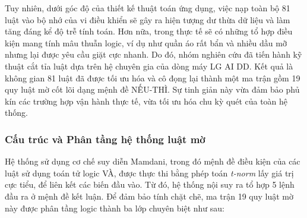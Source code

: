 \documentclass[12pt, a4paper]{article}
\begin{document}
Tuy nhiên, dưới góc độ của thiết kế thuật toán ứng dụng, việc nạp toàn bộ 81 luật vào bộ nhớ của vi điều khiển sẽ gây ra hiện tượng dư thừa dữ liệu và làm tăng đáng kể độ trễ tính toán. Hơn nữa, trong thực tế sẽ có những tổ hợp điều kiện mang tính mâu thuẫn logic, ví dụ như quần áo rất bẩn và nhiều dầu mỡ nhưng lại được yêu cầu giặt cực nhanh. Do đó, nhóm nghiên cứu đã tiến hành kỹ thuật cắt tỉa luật dựa trên hệ chuyên gia của dòng máy LG AI DD. Kết quả là không gian 81 luật đã được tối ưu hóa và cô đọng lại thành một ma trận gồm 19 quy luật mờ cốt lõi dạng mệnh đề NẾU-THÌ. Sự tinh giản này vừa đảm bảo phủ kín các trường hợp vận hành thực tế, vừa tối ưu hóa chu kỳ quét của toàn hệ thống.

\subsubsection{Cấu trúc và Phân tầng hệ thống luật mờ}
Hệ thống sử dụng cơ chế suy diễn Mamdani, trong đó mệnh đề điều kiện của các luật sử dụng toán tử logic VÀ, được thực thi bằng phép toán \textit{t-norm} lấy giá trị cực tiểu, để liên kết các biến đầu vào. Từ đó, hệ thống nội suy ra tổ hợp 5 lệnh đầu ra ở mệnh đề kết luận. Để đảm bảo tính chặt chẽ, ma trận 19 quy luật mờ này được phân tầng logic thành ba lớp chuyên biệt như sau:
\end{document}
